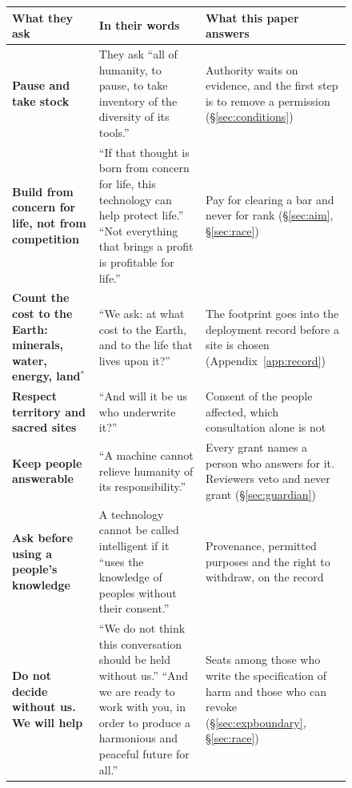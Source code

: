 \documentclass[10pt,twocolumn,letterpaper]{article}
\theoremstyle{definition}
\begin{document}
\begin{figure}[t]
\begin{tcolorbox}
\begin{minipage}[c]{0.30\linewidth}
\begin{tikzpicture}[x=1cm,y=1cm,font=\scriptsize]
\end{tikzpicture}
\end{minipage}\hfill
\begin{minipage}[c]{0.685\linewidth}
\footnotesize
\renewcommand{\arraystretch}{1.14}
\setlength{\tabcolsep}{4pt}
\begin{tabularx}{\linewidth}{@{}P{1.12in}LP{1.62in}@{}}
\toprule
\textbf{What they ask} & \textbf{In their words} & \textbf{What this paper answers}\\
\midrule
\textbf{Pause and take stock} & They ask ``all of humanity, to pause, to take inventory of the diversity of its tools.'' & Authority waits on evidence, and the first step is to remove a permission (\S\ref{sec:conditions})\\\addlinespace[2.5pt]
\textbf{Build from concern for life, not from competition} & ``If that thought is born from concern for life, this technology can help protect life.'' ``Not everything that brings a profit is profitable for life.'' & Pay for clearing a bar and never for rank (\S\ref{sec:aim}, \S\ref{sec:race})\\\addlinespace[2.5pt]
\textbf{Count the cost to the Earth: minerals, water, energy, land}$^{\ast}$ & ``We ask: at what cost to the Earth, and to the life that lives upon it?'' & The footprint goes into the deployment record before a site is chosen (Appendix~\ref{app:record})\\\addlinespace[2.5pt]
\textbf{Respect territory and sacred sites} & ``And will it be us who underwrite it?'' & Consent of the people affected, which consultation alone is not \cite{undrip,ilo169}\\\addlinespace[2.5pt]
\textbf{Keep people answerable} & ``A machine cannot relieve humanity of its responsibility.'' & Every grant names a person who answers for it. Reviewers veto and never grant (\S\ref{sec:guardian})\\\addlinespace[2.5pt]
\textbf{Ask before using a people's knowledge} & A technology cannot be called intelligent if it ``uses the knowledge of peoples without their consent.'' & Provenance, permitted purposes and the right to withdraw, on the record \cite{carroll}\\\addlinespace[2.5pt]
\textbf{Do not decide without us. We will help} & ``We do not think this conversation should be held without us.'' ``And we are ready to work with you, in order to produce a harmonious and peaceful future for all.'' & Seats among those who write the specification of harm and those who can revoke (\S\ref{sec:expboundary}, \S\ref{sec:race})\\

\end{tabularx}
\end{minipage}
\end{tcolorbox}
\end{figure}
\end{document}
